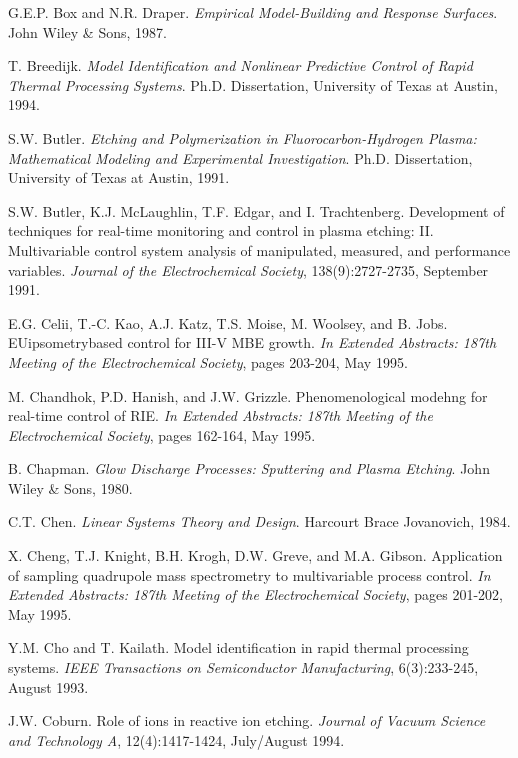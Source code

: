 \begin{thebibliography}{100}
	
	 G.E.P. Box and N.R. Draper. \emph{Empirical Model-Building and Response Surfaces}. John Wiley \& Sons, 1987.

	
	 T. Breedijk. \emph{Model Identification and Nonlinear Predictive Control of Rapid Thermal Processing Systems}. Ph.D. Dissertation, University of Texas at Austin, 1994.
	
	 S.W. Butler. \emph{Etching and Polymerization in Fluorocarbon-Hydrogen Plasma: Mathematical Modeling and Experimental Investigation}. Ph.D. Dissertation, University of Texas at Austin, 1991.
	
	 S.W. Butler, K.J. McLaughlin, T.F. Edgar, and I. Trachtenberg. Development of techniques for real-time monitoring and control in plasma etching: II. Multivariable control system analysis of manipulated, measured, and performance variables. \emph{Journal of the Electrochemical Society}, 138(9):2727-2735, September 1991.

	
	 E.G. Celii, T.-C. Kao, A.J. Katz, T.S. Moise, M. Woolsey, and B. Jobs. EUipsometrybased control for III-V MBE growth. \emph{In Extended Abstracts: 187th Meeting of the Electrochemical Society}, pages 203-204, May 1995.

	
	 M. Chandhok, P.D. Hanish, and J.W. Grizzle. Phenomenological modehng for real-time control of RIE. \emph{In Extended Abstracts: 187th Meeting of the Electrochemical Society}, pages 162-164, May 1995.
	
	 B. Chapman. \emph{Glow Discharge Processes: Sputtering and Plasma Etching}. John Wiley \& Sons, 1980.

	
	 C.T. Chen. \emph{Linear Systems Theory and Design}. Harcourt Brace Jovanovich, 1984.
	
	 X. Cheng, T.J. Knight, B.H. Krogh, D.W. Greve, and M.A. Gibson. Application of sampling quadrupole mass spectrometry to multivariable process control. \emph{In Extended Abstracts: 187th Meeting of the Electrochemical Society}, pages 201-202, May 1995.
	
	 Y.M. Cho and T. Kailath. Model identification in rapid thermal processing systems. \emph{IEEE Transactions on Semiconductor Manufacturing}, 6(3):233-245, August 1993.
	
	 J.W. Coburn. Role of ions in reactive ion etching. \emph{Journal of Vacuum Science and Technology A}, 12(4):1417-1424, July/August 1994.
	

\end{thebibliography}
